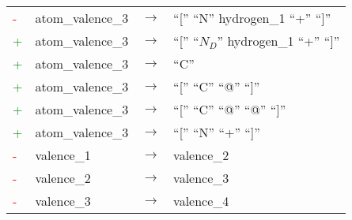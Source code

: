 \begin{longtable}{m{} m{} p{} p{}}
    \textcolor{red}{-} & atom\_valence\_3 & $\rightarrow$ & ``['' ``N'' hydrogen\_1 ``+'' ``]'' \\
    \textcolor{green}{+} & atom\_valence\_3 & $\rightarrow$ & ``['' ``$N_D$'' hydrogen\_1 ``+'' ``]'' \\
    \textcolor{green}{+} & atom\_valence\_3 & $\rightarrow$ & ``C'' \\
    \textcolor{green}{+} & atom\_valence\_3 & $\rightarrow$ & ``['' ``C'' ``@'' ``]'' \\
    \textcolor{green}{+} & atom\_valence\_3 & $\rightarrow$ & ``['' ``C'' ``@'' ``@'' ``]'' \\
    \textcolor{green}{+} & atom\_valence\_3 & $\rightarrow$ & ``['' ``N'' ``+'' ``]'' \\

    \textcolor{red}{-} & valence\_1 & $\rightarrow$ & valence\_2 \\
    \textcolor{red}{-} & valence\_2 & $\rightarrow$ & valence\_3 \\
    \textcolor{red}{-} & valence\_3 & $\rightarrow$ & valence\_4 \\


\end{longtable}
